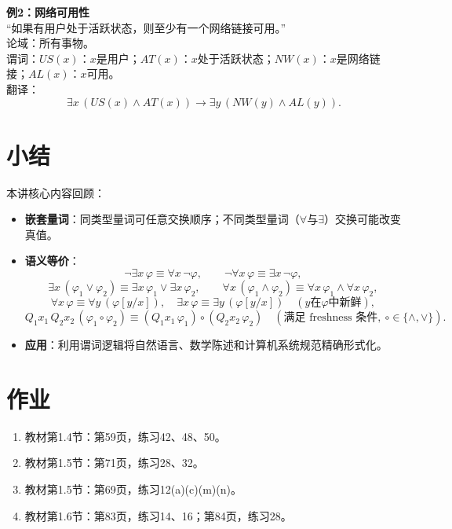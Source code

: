 \documentclass[UTF8,11pt,a4paper]{ctexbook}   %
\theoremstyle{definition}
\begin{document}
\textbf{例2：网络可用性}\\
“如果有用户处于活跃状态，则至少有一个网络链接可用。”\\
论域：所有事物。\\
谓词：$US(x)$：$x$是用户；$AT(x)$：$x$处于活跃状态；$NW(x)$：$x$是网络链接；$AL(x)$：$x$可用。\\
翻译：
\[
\exists x\,(US(x)\land AT(x))\to\exists y\,(NW(y)\land AL(y)).
\]

\section{小结}

本讲核心内容回顾：
\begin{itemize}
    \item \textbf{嵌套量词}：同类型量词可任意交换顺序；不同类型量词（$\forall$与$\exists$）交换可能改变真值。
    \item \textbf{语义等价}：
    \[
    \neg\exists x\,\varphi\equiv\forall x\,\neg\varphi,\qquad
    \neg\forall x\,\varphi\equiv\exists x\,\neg\varphi,
    \]
    \[
    \exists x\,(\varphi_1\lor\varphi_2)\equiv\exists x\,\varphi_1\lor\exists x\,\varphi_2,\qquad
    \forall x\,(\varphi_1\land\varphi_2)\equiv\forall x\,\varphi_1\land\forall x\,\varphi_2,
    \]
    \[
    \forall x\,\varphi\equiv\forall y\,(\varphi[y/x]),\quad
    \exists x\,\varphi\equiv\exists y\,(\varphi[y/x])\quad(\text{$y$在$\varphi$中新鲜}),
    \]
    \[
    Q_1 x_1\,Q_2 x_2\,(\varphi_1\circ\varphi_2)\equiv (Q_1 x_1\,\varphi_1)\circ(Q_2 x_2\,\varphi_2)\quad(\text{满足 freshness 条件},\ \circ\in\{\land,\lor\}).
    \]
    \item \textbf{应用}：利用谓词逻辑将自然语言、数学陈述和计算机系统规范精确形式化。
\end{itemize}

\section{作业}

\begin{enumerate}
    \item 教材第1.4节：第59页，练习42、48、50。
    \item 教材第1.5节：第71页，练习28、32。
    \item 教材第1.5节：第69页，练习12(a)(c)(m)(n)。
    \item 教材第1.6节：第83页，练习14、16；第84页，练习28。
\end{enumerate}
\end{document}
